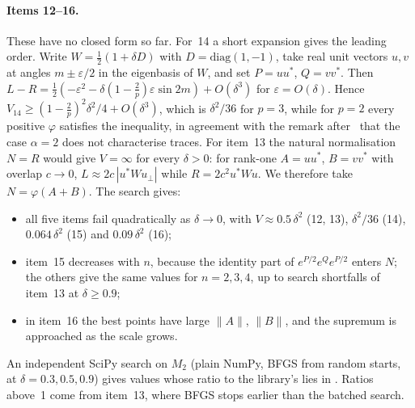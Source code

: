 \paragraph{Items 12--16.} These have no closed form so far. For~14 a short expansion gives the leading order.
Write $W=\frac12(1+\delta D)$ with $D=\mathrm{diag}(1,-1)$, take real unit vectors $u,v$ at angles $m\pm\varepsilon/2$
in the eigenbasis of $W$, and set $P=uu^*$, $Q=vv^*$. Then
$L-R=\frac12(-\varepsilon^2-\delta(1-\frac2p)\varepsilon\sin2m)+O(\delta^3)$ for $\varepsilon=O(\delta)$.
Hence $V_{14}\ge(1-\frac2p)^2\delta^2/4+O(\delta^3)$, which is $\delta^2/36$ for $p=3$, while for $p=2$
every positive $\varphi$ satisfies the inequality, in agreement with the remark after~\cite[Theorem~2]{bikchentaev2011mn}
that the case $\alpha=2$ does not characterise traces. For item~13 the natural normalisation $N=R$
would give $V=\infty$ for every $\delta>0$: for rank-one $A=uu^*$, $B=vv^*$ with overlap $c\to0$,
$L\approx2c\,|u^*Wu_\perp|$ while $R=2c^2u^*Wu$. We therefore take $N=\varphi(A+B)$. The search gives:
\begin{itemize}
\item all five items fail quadratically as $\delta\to0$, with $V\approx0.5\,\delta^2$ (12, 13), $\delta^2/36$ (14),
$0.064\,\delta^2$ (15) and $0.09\,\delta^2$ (16);
\item item~15 decreases with $n$, because the identity part of $e^{P/2}e^Qe^{P/2}$ enters $N$; the others give the
same values for $n=2,3,4$, up to search shortfalls of item~13 at $\delta\ge0.9$;
\item in item~16 the best points have large $\|A\|$, $\|B\|$, and the supremum is approached as the scale grows.
\end{itemize}
An independent SciPy search on $M_2$ (plain NumPy, BFGS from
 random starts, at $\delta=0.3,0.5,0.9$)
gives values whose ratio to the library's lies in
. Ratios
above~1 come from item~13, where BFGS stops earlier than the batched search.

